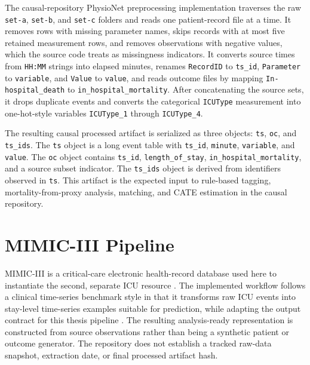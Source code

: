 The causal-repository PhysioNet preprocessing implementation traverses the raw \texttt{set-a}, \texttt{set-b}, and \texttt{set-c} folders and reads one patient-record file at a time.  It removes rows with missing parameter names, skips records with at most five retained measurement rows, and removes observations with negative values, which the source code treats as missingness indicators.  It converts source times from \texttt{HH:MM} strings into elapsed minutes, renames \texttt{RecordID} to \texttt{ts\_id}, \texttt{Parameter} to \texttt{variable}, and \texttt{Value} to \texttt{value}, and reads outcome files by mapping \texttt{In-hospital\_death} to \texttt{in\_hospital\_mortality}.  After concatenating the source sets, it drops duplicate events and converts the categorical \texttt{ICUType} measurement into one-hot-style variables \texttt{ICUType\_1} through \texttt{ICUType\_4}.

The resulting causal processed artifact is serialized as three objects: \texttt{ts}, \texttt{oc}, and \texttt{ts\_ids}.  The \texttt{ts} object is a long event table with \texttt{ts\_id}, \texttt{minute}, \texttt{variable}, and \texttt{value}.  The \texttt{oc} object contains \texttt{ts\_id}, \texttt{length\_of\_stay}, \texttt{in\_hospital\_mortality}, and a source subset indicator.  The \texttt{ts\_ids} object is derived from identifiers observed in \texttt{ts}.  This artifact is the expected input to rule-based tagging, mortality-from-proxy analysis, matching, and CATE estimation in the causal repository.

\section{MIMIC-III Pipeline}
\label{sec:data-preprocessing:mimic-iii-pipeline}

MIMIC-III is a critical-care electronic health-record database used here to instantiate the second, separate ICU resource \cite{johnson2016mimiciii}.  The implemented workflow follows a clinical time-series benchmark style in that it transforms raw ICU events into stay-level time-series examples suitable for prediction, while adapting the output contract for this thesis pipeline \cite{harutyunyan_2019_mimiciii_benchmark}.  The resulting analysis-ready representation is constructed from source observations rather than being a synthetic patient or outcome generator.  The repository does not establish a tracked raw-data snapshot, extraction date, or final processed artifact hash.

